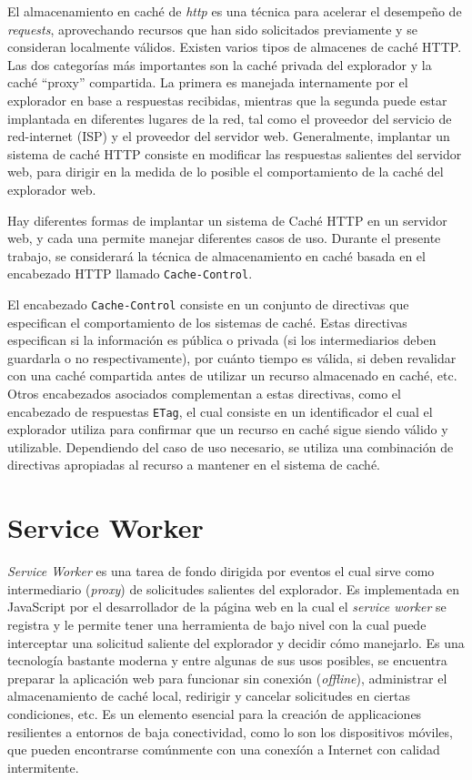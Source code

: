 El almacenamiento en caché de \textit{http} es una técnica para acelerar el desempeño de \textit{requests}, aprovechando recursos que han sido solicitados previamente y se consideran localmente válidos. Existen varios tipos de almacenes de caché HTTP. Las dos categorías más importantes son la caché privada del explorador y la caché ``proxy'' compartida. La primera es manejada internamente por el explorador en base a respuestas recibidas, mientras que la segunda puede estar implantada en diferentes lugares de la red, tal como el proveedor del servicio de red-internet (ISP) y el proveedor del servidor web. Generalmente, implantar un sistema de caché HTTP consiste en modificar las respuestas salientes del servidor web, para dirigir en la medida de lo posible el comportamiento de la caché del explorador web.

Hay diferentes formas de implantar un sistema de Caché HTTP en un servidor web, y cada una permite manejar diferentes casos de uso. Durante el presente trabajo, se considerará la técnica de almacenamiento en caché basada en el encabezado HTTP llamado \texttt{Cache-Control}.

El encabezado \texttt{Cache-Control} consiste en un conjunto de directivas que especifican el comportamiento de los sistemas de caché. Estas directivas especifican si la información es pública o privada (si los intermediarios deben guardarla o no respectivamente), por cuánto tiempo es válida, si deben revalidar con una caché compartida antes de utilizar un recurso almacenado en caché, etc. Otros encabezados asociados complementan a estas directivas, como el encabezado de respuestas \texttt{ETag}, el cual consiste en un identificador el cual el explorador utiliza para confirmar que un recurso en caché sigue siendo válido y utilizable. Dependiendo del caso de uso necesario, se utiliza una combinación de directivas apropiadas al recurso a mantener en el sistema de caché.

\section{Service Worker}

\textit{Service Worker} es una tarea de fondo dirigida por eventos el cual sirve como intermediario (\textit{proxy}) de solicitudes salientes del explorador. Es implementada en JavaScript por el desarrollador de la página web en la cual el \textit{service worker} se registra y le permite tener una herramienta de bajo nivel con la cual puede interceptar una solicitud saliente del explorador y decidir cómo manejarlo. Es una tecnología bastante moderna y entre algunas de sus usos posibles, se encuentra preparar la aplicación web para funcionar sin conexión (\textit{offline}), administrar el almacenamiento de caché local, redirigir y cancelar solicitudes en ciertas condiciones, etc. Es un elemento esencial para la creación de applicaciones resilientes a entornos de baja conectividad, como lo son los dispositivos móviles, que pueden encontrarse comúnmente con una conexíón a Internet con calidad intermitente.

